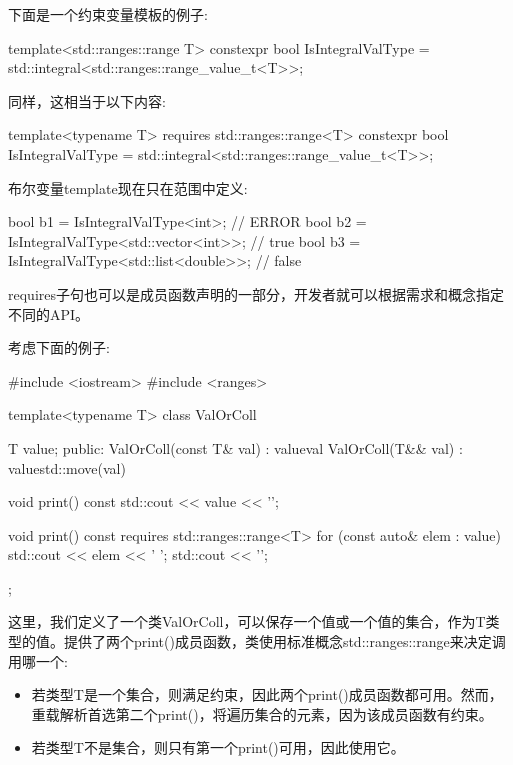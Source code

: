 
下面是一个约束变量模板的例子:

\begin{cpp}
template<std::ranges::range T>
constexpr bool IsIntegralValType = std::integral<std::ranges::range_value_t<T>>;
\end{cpp}

同样，这相当于以下内容:

\begin{cpp}
template<typename T>
requires std::ranges::range<T>
constexpr bool IsIntegralValType = std::integral<std::ranges::range_value_t<T>>;
\end{cpp}

布尔变量template现在只在范围中定义:

\begin{cpp}
bool b1 = IsIntegralValType<int>; // ERROR
bool b2 = IsIntegralValType<std::vector<int>>; // true
bool b3 = IsIntegralValType<std::list<double>>; // false
\end{cpp}


requires子句也可以是成员函数声明的一部分，开发者就可以根据需求和概念指定不同的API。

考虑下面的例子:


\begin{cpp}
#include <iostream>
#include <ranges>

template<typename T>
class ValOrColl {
	T value;
	public:
	ValOrColl(const T& val)
	: value{val} {
	}
	ValOrColl(T&& val)
	: value{std::move(val)} {
	}
	
	void print() const {
		std::cout << value << '\n';
	}
	
	void print() const requires std::ranges::range<T> {
		for (const auto& elem : value) {
			std::cout << elem << ' ';
		}
		std::cout << '\n';
	}
};
\end{cpp}

这里，我们定义了一个类ValOrColl，可以保存一个值或一个值的集合，作为T类型的值。提供了两个print()成员函数，类使用标准概念std::ranges::range来决定调用哪一个:

\begin{itemize}
\item
若类型T是一个集合，则满足约束，因此两个print()成员函数都可用。然而，重载解析首选第二个print()，将遍历集合的元素，因为该成员函数有约束。

\item
若类型T不是集合，则只有第一个print()可用，因此使用它。
\end{itemize}

